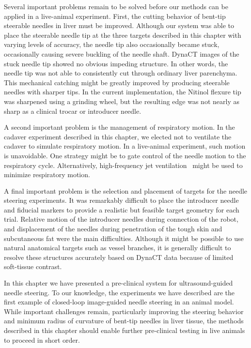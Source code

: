 Several important problems remain to be solved before our methods can be applied in a live-animal experiment. First, the cutting behavior of bent-tip steerable needles in liver must be improved. Although our system was able to place the steerable needle tip at the three targets described in this chapter with varying levels of accuracy, the needle tip also occasionally became stuck, occasionally causing severe buckling of the needle shaft. DynaCT images of the stuck needle tip showed no obvious impeding structure. In other words, the needle tip was not able to consistently cut through ordinary liver parenchyma. This mechanical catching might be greatly improved by producing steerable needles with sharper tips. In the current implementation, the Nitinol flexure tip was sharpened using a grinding wheel, but the resulting edge was not nearly as sharp as a clinical trocar or introducer needle.

A second important problem is the management of respiratory motion. In the cadaver experiment described in this chapter, we elected not to ventilate the cadaver to simulate respiratory motion. In a live-animal experiment, such motion is unavoidable. One strategy might be to gate control of the needle motion to the respiratory cycle. Alternatively, high-frequency jet ventilation~\cite{Denys2014} might be used to minimize respiratory motion.

A final important problem is the selection and placement of targets for the needle steering experiments. It was remarkably difficult to place the introducer needle and fiducial markers to provide a realistic but feasible target geometry for each trial. Relative motion of the introducer needles during connection of the robot, and displacement of the needles during penetration of the tough skin and subcutaneous fat were the main difficulties. Although it might be possible to use natural anatomical targets such as vessel branches, it is generally difficult to resolve these structures accurately based on DynaCT data because of limited soft-tissue contrast.

In this chapter we have presented a pre-clinical system for ultrasound-guided needle steering. To our knowledge, the experiments we have described are the first example of closed-loop image-guided needle steering in an animal model. While important challenges remain, particularly improving the steering behavior and minimum radius of curvature of bent-tip needles in liver tissue, the methods described in this chapter should enable further pre-clinical testing in live animals to proceed in short order.  

